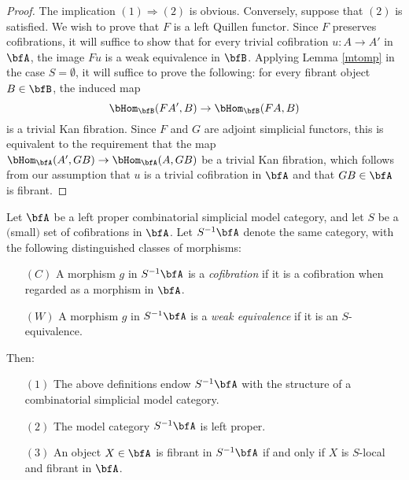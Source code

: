 \begin{proof}
The implication $(1) \Rightarrow (2)$ is obvious. Conversely, suppose that $(2)$ is satisfied.
We wish to prove that $F$ is a left Quillen functor. Since $F$ preserves cofibrations, it will suffice
to show that for every trivial cofibration $u: A \rightarrow A'$ in $\bfA$, the image
$Fu$ is a weak equivalence in $\bfB$. Applying Lemma \ref{mtomp} in the case
$S = \emptyset$, it will suffice to prove the following: for every fibrant object $B \in \bfB$, the
induced map
$$ \bHom_{ \bfB}( FA', B) \rightarrow \bHom_{\bfB}( FA, B)$$
is a trivial Kan fibration. Since $F$ and $G$ are adjoint simplicial functors, this is equivalent
to the requirement that the map $\bHom_{\bfA}( A', GB) \rightarrow \bHom_{\bfA}(A, GB)$ be
a trivial Kan fibration, which follows from our assumption that $u$ is a trivial cofibration in
$\bfA$ and that $GB \in \bfA$ is fibrant.
\end{proof}

\begin{proposition}\label{suritu}
Let $\bfA$ be a left proper combinatorial simplicial model category, and let $S$ be a $($small$)$ set of cofibrations in $\bfA$. 
Let $S^{-1} \bfA$ denote the same category, with the following distinguished classes of morphisms:
\begin{itemize}
\item[$(C)$] A morphism $g$ in $S^{-1} \bfA$ is a {\it cofibration} if it is a cofibration when regarded as a morphism in $\bfA$.
\item[$(W)$] A morphism $g$ in $S^{-1} \bfA$ is a {\it weak equivalence} if it is an $S$-equivalence.
\end{itemize}
Then:
\begin{itemize}
\item[$(1)$] The above definitions endow $S^{-1} \bfA$ with the structure of a combinatorial simplicial model category.
\item[$(2)$] The model category $S^{-1} \bfA$ is left proper.
\item[$(3)$] An object $X \in \bfA$ is fibrant in $S^{-1} \bfA$ if and only if $X$ is $S$-local and fibrant in $\bfA$.
\end{itemize}
\end{proposition}

